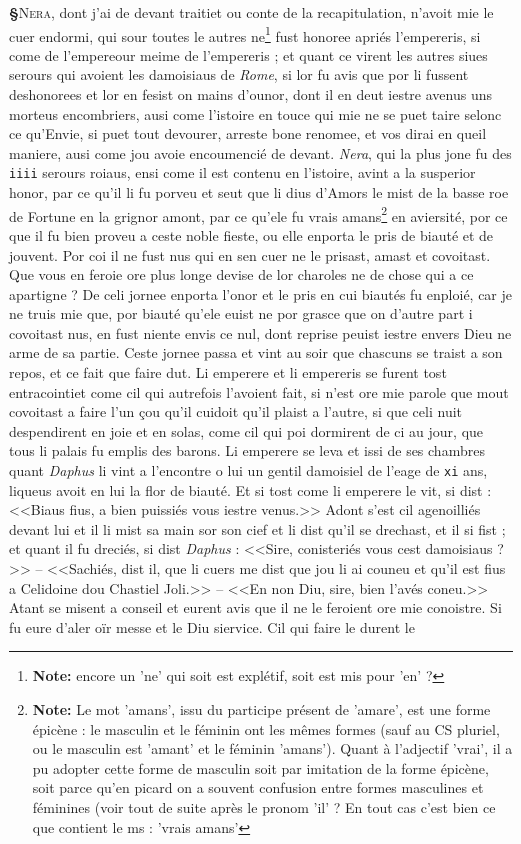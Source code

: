\documentclass[12pt]{article} %
\newcommand{\colmar}[1]{\marginnote{[#1]}}          %
\newcommand{\persName}[1]{\emph{#1}} %
\newcommand{\placeName}[1]{\emph{#1}} %
\newcommand{\num}[1]{\texttt{#1}}    %
\newcommand{\supplied}[1]{\textlangle#1\textrangle} %
\newcommand{\fnnote}[1]{\footnote{\textbf{Note:} #1}} %
\newcounter{paranum}
\newcommand{\pnum}{\stepcounter{paranum}\textbf{§\arabic{paranum}}\quad}
\begin{document}
\pnum \lettrine[lines=2]{\color{darkred}N}{era}, dont j'ai de devant traitiet ou conte de la recapitulation, n'avoit mie le cuer endormi, qui sour toutes le autres ne\fnnote{encore un 'ne' qui soit est explétif, soit est mis pour 'en' ?} fust honoree apriés l'empereris, si come de l'empereour meime de l'empereris ; et quant ce virent les autres siues serours qui avoient les damoisiaus de \placeName{Rome}, si lor fu avis que por li fussent deshonorees et lor en fesist on mains d'ounor, dont il en deut iestre avenus uns morteus encombriers, ausi come l'istoire en touce qui mie ne se puet taire selonc ce qu'Envie, si puet tout devourer, arreste bone renomee, et vos dirai en queil maniere, ausi come jou avoie encoumencié de devant. \persName{Nera}, qui la plus jone fu des \num{iiii} serours roiaus, ensi come il est contenu en l'istoire, avint a la susperior honor, par ce qu'il li fu porveu et seut que li dius d'Amors le mist de la basse roe de Fortune en la grignor amont, par ce qu'ele fu vrais amans\fnnote{Le mot 'amans', issu du participe présent de 'amare', est une forme épicène : le masculin et le féminin ont les mêmes formes (sauf au CS pluriel, ou le masculin est 'amant' et le féminin 'amans'). Quant à l'adjectif 'vrai', il a pu adopter cette forme de masculin soit par imitation de la forme épicène, soit parce qu'en picard on a souvent confusion entre formes masculines et féminines (voir tout de suite après le pronom 'il' ? En tout cas c'est bien ce que contient le ms : 'vrais amans'} en aviersité, por ce que il fu bien prove\supplied{u} a ceste noble fieste, ou elle enporta le pris de biauté et de jouvent. Por coi il ne fust nus qui en sen cuer ne le prisast, amast et covoitast. Que vous en feroie ore plus longe devise de lor charoles ne de chose qui a ce apartigne ? De celi jornee enporta l'onor et le pris en cui biautés fu enploié, car je ne truis mie que, por biauté qu'ele euist ne por grasce que on d'autre part i covoitast nus, en fust niente envis ce nul, dont reprise peuist iestre envers Dieu ne arme de sa partie. Ceste jornee passa et vint au soir que chascuns se traist a son repos, et ce fait que faire dut. Li emperere et li empereris se furent tost entracointiet come cil qui autrefois l'avoient fait, si n'est ore mie parole que mout covoitast a faire l'un çou qu'il cuidoit qu'il plaist a l'autre, si que celi nuit despendirent en joie et en solas, come cil qui poi dormirent de ci au jour, que tous li palais fu emplis des barons. Li emperere se leva et issi de ses chambres quant \persName{Daphus} li vint a l'encontre o lui un ge\supplied{n}til damoisiel de l'eage de \num{xi} ans, liqueus avoit en lui la flor de biauté. Et si tost come li emperere le vit, si dist : <<Biaus fius, a bien puissiés vous iestre venus.>> Adont s'est cil agenoilliés devant lui et il li mist sa main sor \colmar{3vb}\colmar{b} son cief et li dist qu'il se drechast, et il si fist ; et quant il fu dreciés, si dist \persName{Daphus} : <<Sire, conisteriés vous cest damoisiaus ?>> -- <<Sachiés, dist il, que li cuers me dist que jou li ai couneu et qu'il est fius a Celidoine dou Chastiel Joli.>> -- <<En non Diu, sire, bien l'avés coneu.>> Atant se misent a conseil et eurent avis que il ne le feroient ore mie conoistre. Si fu eure d'aler oïr messe et le Diu siervice. Cil qui faire le durent le 
\end{document}

